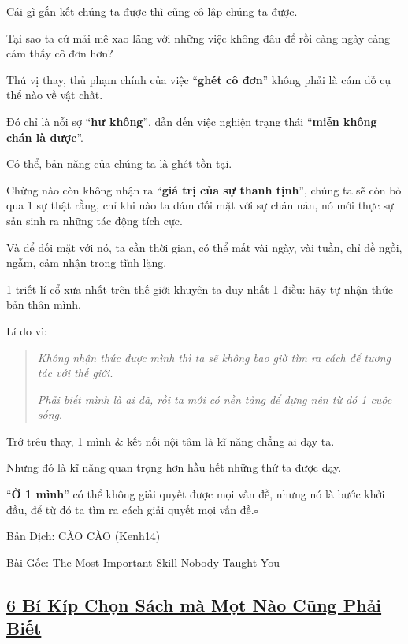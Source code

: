 \documentclass{article}
\begin{document}
%
Cái gì gắn kết chúng ta được thì cũng cô lập chúng ta được.

Tại sao ta cứ mải mê xao lãng với những việc không đâu để rồi càng ngày càng cảm thấy cô đơn hơn?

%
Thú vị thay, thủ phạm chính của việc ``\textbf{ghét cô đơn}'' không phải là cám dỗ cụ thể nào về vật chất.

Đó chỉ là nỗi sợ ``\textbf{hư không}'', dẫn đến việc nghiện trạng thái ``\textbf{miễn không chán là được}''.

Có thể, bản năng của chúng ta là ghét tồn tại.

%
Chừng nào còn không nhận ra ``\textbf{giá trị của sự thanh tịnh}'', chúng ta sẽ còn bỏ qua 1 sự thật rằng, chỉ khi nào ta dám đối mặt với sự chán nản, nó mới thực sự sản sinh ra những tác động tích cực.

Và để đối mặt với nó, ta cần thời gian, có thể mất vài ngày, vài tuần, chỉ đề ngồi, ngẫm, cảm nhận trong tĩnh lặng.

%
1 triết lí cổ xưa nhất trên thế giới khuyên ta duy nhất 1 điều: hãy tự nhận thức bản thân mình.

Lí do vì:

\begin{quotation}
	\textit{Không nhận thức được mình thì ta sẽ không bao giờ tìm ra cách để tương tác với thế giới}.
	
	\textit{Phải biết mình là ai đã, rồi ta mới có nền tảng để dựng nên từ đó 1 cuộc sống}.
\end{quotation}
Trớ trêu thay, 1 mình \& kết nối nội tâm là kĩ năng chẳng ai dạy ta.

Nhưng đó là kĩ năng quan trọng hơn hầu hết những thứ ta được dạy.

%
``\textbf{Ở 1 mình}'' có thể không giải quyết được mọi vấn đề, nhưng nó là bước khởi đầu, để từ đó ta tìm ra cách giải quyết mọi vấn đề.\hfill$\square$

\begin{flushright}
	Bản Dịch: CÀO CÀO (Kenh14)
	
	Bài Gốc: \href{https://medium.com/personal-growth/the-most-important-skill-nobody-taught-you-9b162377ab77}{The Most Important Skill Nobody Taught You}
\end{flushright}


\subsection{\href{http://tramdoc.vn/tin-tuc/sau-bi-kip-chon-sach-ma-mot-nao-cung-phai-biet-nVoMW.html}{6 Bí Kíp Chọn Sách mà Mọt Nào Cũng Phải Biết}}
\end{document}

